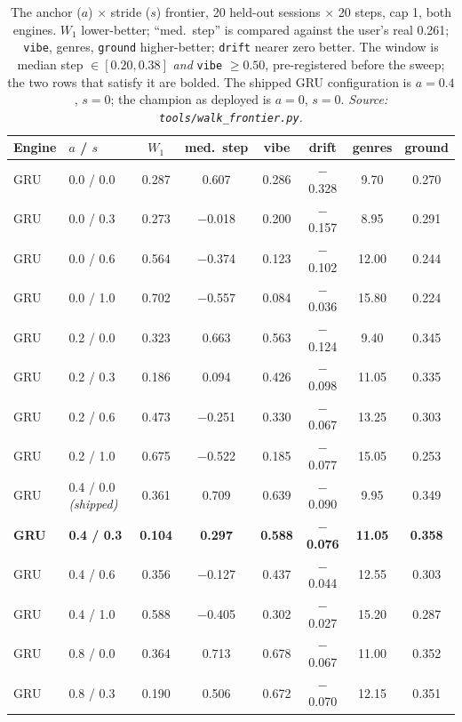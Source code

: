 \documentclass[11pt]{article}
\newcommand{\best}[1]{\textbf{#1}}
\begin{document}
\begin{table}[ht]
  \centering
  \caption{The anchor ($a$) $\times$ stride ($s$) frontier, \num{20} held-out
  sessions $\times$ \num{20} steps, cap 1, both engines. $W_1$ lower-better;
  ``med.\ step'' is compared against the user's real \num{0.261}; \texttt{vibe},
  genres, \texttt{ground} higher-better; \texttt{drift} nearer zero better. The
  window is median step $\in[\num{0.20},\num{0.38}]$ \emph{and} \texttt{vibe}
  $\ge\num{0.50}$, pre-registered before the sweep; the two rows that satisfy it
  are bolded. The shipped GRU configuration is $a=\num{0.4}$, $s=\num{0}$; the
  champion as deployed is $a=\num{0}$, $s=\num{0}$.
  \emph{Source: \texttt{tools/walk\_frontier.py}.}}
  \label{tab:walk-frontier}
  {\footnotesize\setlength{\tabcolsep}{5pt}\begin{tabular}{llcccccc}
    \toprule
    Engine & $a$ / $s$ & $W_1$ & med.\ step & vibe & drift & genres & ground \\
    \midrule
    GRU & 0.0 / 0.0 & 0.287 & 0.607 & 0.286 & $-$0.328 & 9.70 & 0.270 \\
    GRU & 0.0 / 0.3 & 0.273 & $-$0.018 & 0.200 & $-$0.157 & 8.95 & 0.291 \\
    GRU & 0.0 / 0.6 & 0.564 & $-$0.374 & 0.123 & $-$0.102 & 12.00 & 0.244 \\
    GRU & 0.0 / 1.0 & 0.702 & $-$0.557 & 0.084 & $-$0.036 & 15.80 & 0.224 \\
    GRU & 0.2 / 0.0 & 0.323 & 0.663 & 0.563 & $-$0.124 & 9.40 & 0.345 \\
    GRU & 0.2 / 0.3 & 0.186 & 0.094 & 0.426 & $-$0.098 & 11.05 & 0.335 \\
    GRU & 0.2 / 0.6 & 0.473 & $-$0.251 & 0.330 & $-$0.067 & 13.25 & 0.303 \\
    GRU & 0.2 / 1.0 & 0.675 & $-$0.522 & 0.185 & $-$0.077 & 15.05 & 0.253 \\
    GRU & 0.4 / 0.0 \emph{(shipped)} & 0.361 & 0.709 & 0.639 & $-$0.090 & 9.95 & 0.349 \\
    \best{GRU} & \best{0.4 / 0.3} & \best{0.104} & \best{0.297} & \best{0.588} & \best{$-$0.076} & \best{11.05} & \best{0.358} \\
    GRU & 0.4 / 0.6 & 0.356 & $-$0.127 & 0.437 & $-$0.044 & 12.55 & 0.303 \\
    GRU & 0.4 / 1.0 & 0.588 & $-$0.405 & 0.302 & $-$0.027 & 15.20 & 0.287 \\
    GRU & 0.8 / 0.0 & 0.364 & 0.713 & 0.678 & $-$0.067 & 11.00 & 0.352 \\
    GRU & 0.8 / 0.3 & 0.190 & 0.506 & 0.672 & $-$0.070 & 12.15 & 0.351 \\

\end{tabular}}
\end{table}
\end{document}
